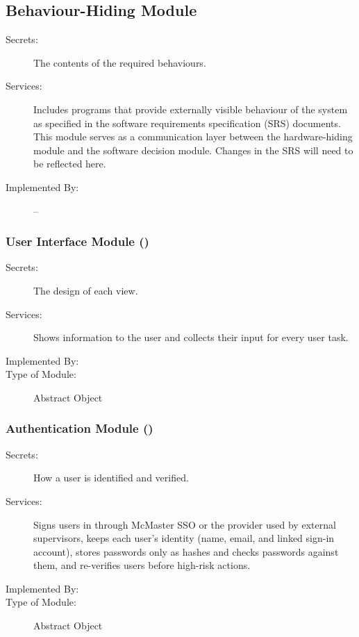 \documentclass[12pt, titlepage]{article}
\newcommand{\descriptiveid}[1]{{\noexpandarg\StrSubstitute{#1}{_}{\textunderscore\allowbreak}[\idtmp]\texttt{\idtmp}}}
\begin{document}
\subsection{Behaviour-Hiding Module}

\begin{description}
\item[Secrets:]The contents of the required behaviours.
\item[Services:]Includes programs that provide externally visible behaviour of
  the system as specified in the software requirements specification (SRS)
  documents. This module serves as a communication layer between the
  hardware-hiding module and the software decision module. Changes in the SRS
  will need to be reflected here.
\item[Implemented By:] --
\end{description}


\subsubsection[User Interface Module]{User Interface Module (\protect\descriptiveid{M_UserInterface})}\label{M_UserInterface}

\begin{description}
\item[Secrets:] The design of each view.
\item[Services:] Shows information to the user and collects their input for every user task.
\item[Implemented By:] \projname{}
\item[Type of Module:] Abstract Object
\end{description}

\subsubsection[Authentication Module]{Authentication Module (\protect\descriptiveid{M_Authentication})}\label{M_Authentication}

\begin{description}
\item[Secrets:] How a user is identified and verified.
\item[Services:] Signs users in through McMaster SSO or the provider used by external supervisors, keeps each user's identity (name, email, and linked sign-in account), stores passwords only as hashes and checks passwords against them, and re-verifies users before high-risk actions.
\item[Implemented By:] \projname{}
\item[Type of Module:] Abstract Object
\end{description}
\end{document}
